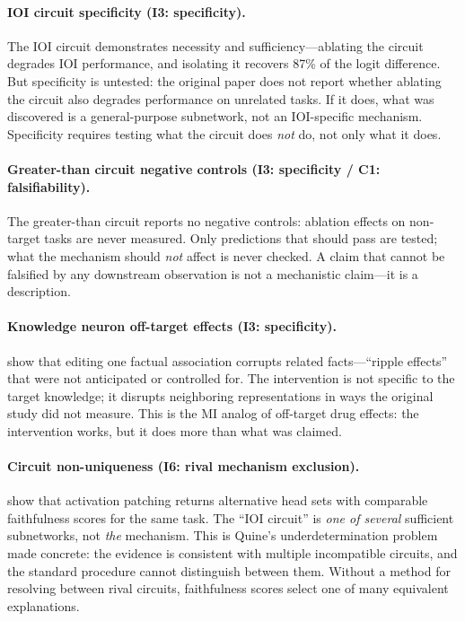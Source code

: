 \documentclass{article}
\begin{document}
\paragraph{IOI circuit specificity (I3: specificity).}
The IOI circuit \citep{wang2023interpretability} demonstrates necessity and sufficiency---ablating the circuit degrades IOI performance, and isolating it recovers 87\% of the logit difference. But specificity is untested: the original paper does not report whether ablating the circuit also degrades performance on unrelated tasks. If it does, what was discovered is a general-purpose subnetwork, not an IOI-specific mechanism. Specificity requires testing what the circuit does \emph{not} do, not only what it does.

\paragraph{Greater-than circuit negative controls (I3: specificity / C1: falsifiability).}
The greater-than circuit \citep{hanna2023greater} reports no negative controls: ablation effects on non-target tasks are never measured. Only predictions that should pass are tested; what the mechanism should \emph{not} affect is never checked. A claim that cannot be falsified by any downstream observation is not a mechanistic claim---it is a description.

\paragraph{Knowledge neuron off-target effects (I3: specificity).}
\citet{cohen2024evaluating} show that editing one factual association corrupts related facts---``ripple effects'' that were not anticipated or controlled for. The intervention is not specific to the target knowledge; it disrupts neighboring representations in ways the original study did not measure. This is the MI analog of off-target drug effects: the intervention works, but it does more than what was claimed.

\paragraph{Circuit non-uniqueness (I6: rival mechanism exclusion).}
\citet{meloux2025everything} show that activation patching returns alternative head sets with comparable faithfulness scores for the same task. The ``IOI circuit'' is \emph{one of several} sufficient subnetworks, not \emph{the} mechanism. This is Quine's underdetermination problem \citep{quine1951two} made concrete: the evidence is consistent with multiple incompatible circuits, and the standard procedure cannot distinguish between them. Without a method for resolving between rival circuits, faithfulness scores select one of many equivalent explanations.
\end{document}
